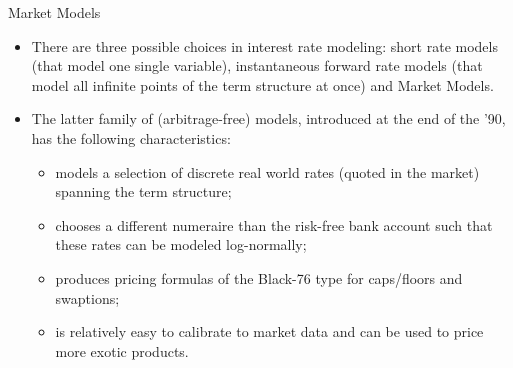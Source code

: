 \documentclass{beamer}
\begin{document}
\begin{frame}{Market Models}
	\begin{itemize}
		\item<1-> There are three possible choices in interest rate modeling: \textcolor{maincolor}{short rate models} (that model one single variable), \textcolor{maincolor}{instantaneous forward rate models} (that model all infinite points of the term structure at once) and \textcolor{maincolor}{Market Models}.
		\item<2-> The latter family of (arbitrage-free) models, introduced at the end of the '90, has the following characteristics:
		\begin{itemize}
			\item<3-> models a selection of discrete real world rates (quoted in the market) spanning the term structure;
			\item<4-> chooses a different numeraire than the risk-free bank account such that these rates can be modeled log-normally;
			\item<5-> produces pricing formulas of the Black-76 type for caps/floors and swaptions;
			\item<6-> is relatively easy to calibrate to market data and can be used to price more exotic products.
		\end{itemize}
	\end{itemize}
\end{frame}
\end{document}
